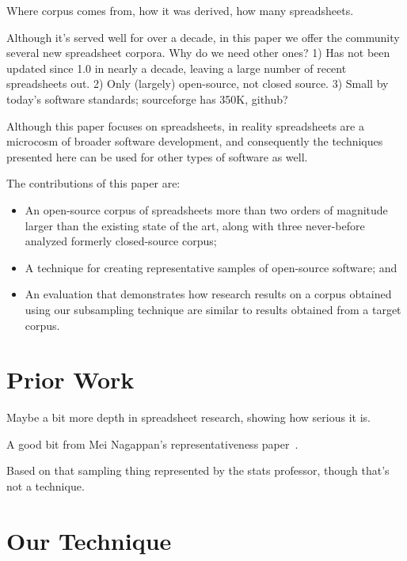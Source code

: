 \documentclass[conference]{IEEEtran}
\begin{document}
Where corpus comes from, how it was derived, how many spreadsheets.

Although it's served well for over a decade, in this paper we offer the community 
several new spreadsheet corpora.
Why do we need other ones?
1) Has not been updated since 1.0 in nearly a decade, leaving a large number of recent
spreadsheets out.
2) Only (largely) open-source, not closed source.
3) Small by today's software standards; sourceforge has 350K, github?

Although this paper focuses on spreadsheets, in reality 
spreadsheets are a microcosm of broader software development,
and consequently the techniques presented here can be used for other 
types of software as well.

The contributions of this paper are:

\begin{itemize}
  \item An open-source corpus of spreadsheets more than two orders of magnitude larger
 		than the existing state of the art, along with three never-before analyzed
 		formerly closed-source corpus;
  \item A technique for creating representative samples of open-source
  		software; and
  \item An evaluation that demonstrates 
		how research results on a corpus obtained using our subsampling technique
		are similar to results obtained from a target corpus.
\end{itemize}

\section{Prior Work}

Maybe a bit more depth in spreadsheet research, showing how serious it is.

A good bit from Mei Nagappan's representativeness paper~\cite{nagappan2013diversity}.

Based on that sampling thing represented by the stats professor,
though that's not a technique.

\section{Our Technique}
\end{document}
